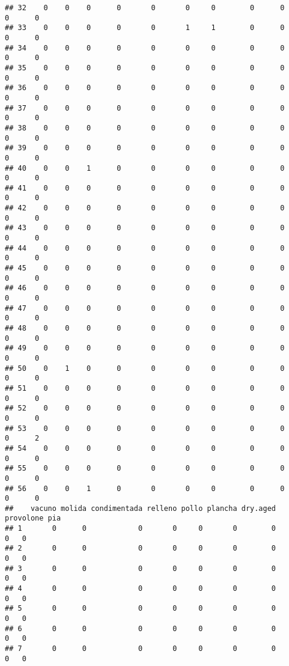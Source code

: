 \documentclass[
]{article}
\begin{document}
\begin{verbatim}
## 32    0    0    0      0       0       0     0        0      0        0      0
## 33    0    0    0      0       0       1     1        0      0        0      0
## 34    0    0    0      0       0       0     0        0      0        0      0
## 35    0    0    0      0       0       0     0        0      0        0      0
## 36    0    0    0      0       0       0     0        0      0        0      0
## 37    0    0    0      0       0       0     0        0      0        0      0
## 38    0    0    0      0       0       0     0        0      0        0      0
## 39    0    0    0      0       0       0     0        0      0        0      0
## 40    0    0    1      0       0       0     0        0      0        0      0
## 41    0    0    0      0       0       0     0        0      0        0      0
## 42    0    0    0      0       0       0     0        0      0        0      0
## 43    0    0    0      0       0       0     0        0      0        0      0
## 44    0    0    0      0       0       0     0        0      0        0      0
## 45    0    0    0      0       0       0     0        0      0        0      0
## 46    0    0    0      0       0       0     0        0      0        0      0
## 47    0    0    0      0       0       0     0        0      0        0      0
## 48    0    0    0      0       0       0     0        0      0        0      0
## 49    0    0    0      0       0       0     0        0      0        0      0
## 50    0    1    0      0       0       0     0        0      0        0      0
## 51    0    0    0      0       0       0     0        0      0        0      0
## 52    0    0    0      0       0       0     0        0      0        0      0
## 53    0    0    0      0       0       0     0        0      0        0      2
## 54    0    0    0      0       0       0     0        0      0        0      0
## 55    0    0    0      0       0       0     0        0      0        0      0
## 56    0    0    1      0       0       0     0        0      0        0      0
##    vacuno molida condimentada relleno pollo plancha dry.aged provolone pia
## 1       0      0            0       0     0       0        0         0   0
## 2       0      0            0       0     0       0        0         0   0
## 3       0      0            0       0     0       0        0         0   0
## 4       0      0            0       0     0       0        0         0   0
## 5       0      0            0       0     0       0        0         0   0
## 6       0      0            0       0     0       0        0         0   0
## 7       0      0            0       0     0       0        0         0   0

\end{verbatim}
\end{document}
